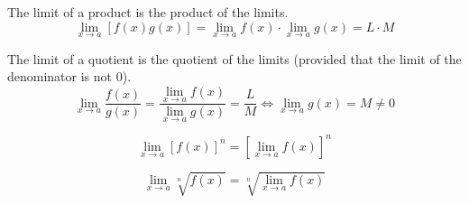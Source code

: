 \begin{theorem}
    The limit of a product is the product of the limits.
    \[\lim_{x\to a}[f(x)g(x)]=\lim_{x\to a}f(x)\cdot\lim_{x\to a}g(x)=L\cdot M\]
\end{theorem}
\begin{theorem}
    The limit of a quotient is the quotient of the limits (provided that the
    limit of the denominator is not 0).
    \[\lim_{x\to a}\frac{f(x)}{g(x)}=\frac{\lim_{x\to a}f(x)}{\lim_{x\to a}g(x)}
    =\frac{L}{M} \iff \lim_{x\to a}g(x)=M\neq0\]
\end{theorem}
\begin{theorem}
    \[\lim_{x\to a}[f(x)]^n = [\lim_{x\to a}f(x)]^n\]
\end{theorem}
\begin{theorem}
    \[\lim_{x\to a}\sqrt[n]{f(x)} = \sqrt[n]{\lim_{x\to a}f(x)}\]
\end{theorem}